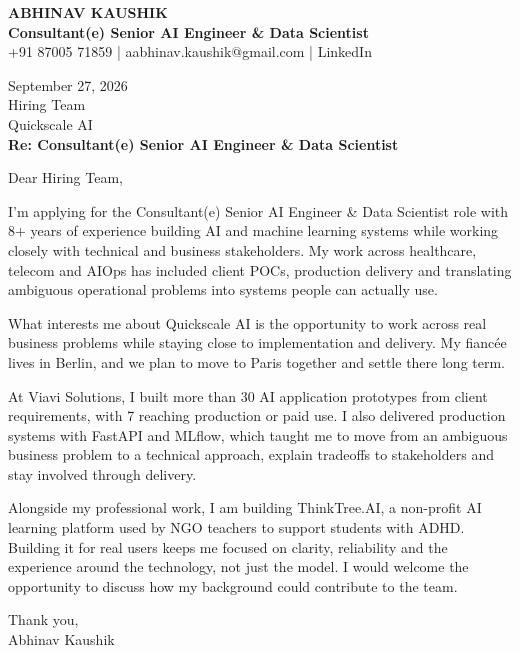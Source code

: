 \documentclass[10pt,a4paper]{article}
\begin{document}
\begin{center}
{\Large\bfseries ABHINAV KAUSHIK}\\[2pt]
{\bfseries Consultant(e) Senior AI Engineer \& Data Scientist}\\[2pt]
+91 87005 71859 \quad | \quad aabhinav.kaushik@gmail.com \quad | \quad LinkedIn
\end{center}
\vspace{8pt}
September 27, 2026\\[6pt]
Hiring Team\\
Quickscale AI\\[4pt]
\textbf{Re: Consultant(e) Senior AI Engineer \& Data Scientist}

Dear Hiring Team,

I’m applying for the Consultant(e) Senior AI Engineer \& Data Scientist role with 8+ years of experience building AI and machine learning systems while working closely with technical and business stakeholders. My work across healthcare, telecom and AIOps has included client POCs, production delivery and translating ambiguous operational problems into systems people can actually use.

What interests me about Quickscale AI is the opportunity to work across real business problems while staying close to implementation and delivery. My fiancée lives in Berlin, and we plan to move to Paris together and settle there long term.

At Viavi Solutions, I built more than 30 AI application prototypes from client requirements, with 7 reaching production or paid use. I also delivered production systems with FastAPI and MLflow, which taught me to move from an ambiguous business problem to a technical approach, explain tradeoffs to stakeholders and stay involved through delivery.

Alongside my professional work, I am building ThinkTree.AI, a non-profit AI learning platform used by NGO teachers to support students with ADHD. Building it for real users keeps me focused on clarity, reliability and the experience around the technology, not just the model. I would welcome the opportunity to discuss how my background could contribute to the team.

Thank you,\\
Abhinav Kaushik
\end{document}
